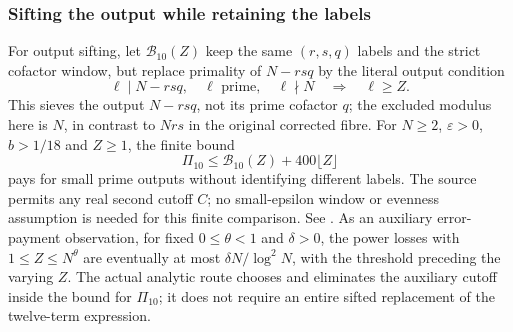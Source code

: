 \subsubsection{Sifting the output while retaining the labels}
\label{sec:liliu-output-sift}
For output sifting, let $\mathcal B_{10}(Z)$ keep the same $(r,s,q)$
labels and the strict cofactor window, but replace primality of $N-rsq$
by the literal output condition
\[
 \ell\mid N-rsq,\quad \ell\text{ prime},\quad \ell\nmid N
 \quad\Longrightarrow\quad \ell\ge Z.
\]
This sieves the output $N-rsq$, not its prime cofactor $q$; the excluded
modulus here is $N$, in contrast to $Nrs$ in the original corrected fibre.
For $N\ge2$, $\varepsilon>0$, $b>1/18$ and $Z\ge1$, the finite bound
\[
 \Pi_{10}\le\mathcal B_{10}(Z)+400\lfloor Z\rfloor
\]
pays for small prime outputs without identifying different labels.
The source permits any real second cutoff $C$; no small-epsilon window or
evenness assumption is needed for this finite comparison.
See .
As an auxiliary error-payment observation, for fixed $0\le\theta<1$
and $\delta>0$, the power losses with $1\le Z\le N^\theta$ are eventually
at most $\delta N/\log^2N$, with the threshold preceding the varying $Z$.
The actual analytic route chooses and eliminates the auxiliary cutoff
inside the bound for $\Pi_{10}$; it does not require an entire sifted
replacement of the twelve-term expression.


